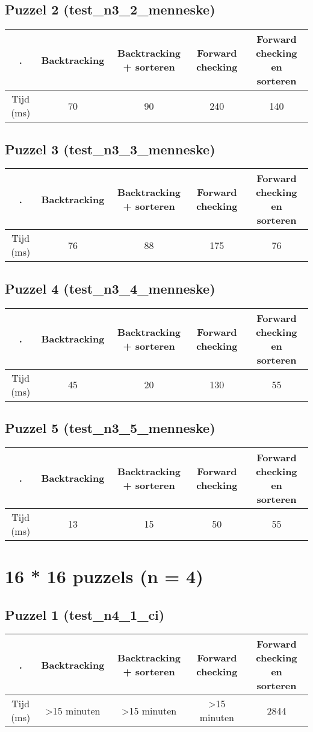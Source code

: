 \documentclass[]{report}
\begin{document}
\begin{appendices}
\subsection{Puzzel 2 (test\_n3\_2\_menneske)}
\begin{tabular}{|c||c|c|c|c|}
\hline . & Backtracking & Backtracking + sorteren & Forward checking & Forward checking en sorteren \\ 
\hline \hline Tijd (ms) & 70 & 90 & 240 & 140 \\ 
\hline 
\end{tabular}
\subsection{Puzzel 3 (test\_n3\_3\_menneske)}
\begin{tabular}{|c||c|c|c|c|}
\hline . & Backtracking & Backtracking + sorteren & Forward checking & Forward checking en sorteren \\ 
\hline \hline Tijd (ms) & 76 & 88 & 175 & 76 \\ 
\hline 
\end{tabular}
\subsection{Puzzel 4 (test\_n3\_4\_menneske)}
\begin{tabular}{|c||c|c|c|c|}
\hline . & Backtracking & Backtracking + sorteren & Forward checking & Forward checking en sorteren \\ 
\hline \hline Tijd (ms) & 45 & 20 & 130 & 55 \\ 
\hline 
\end{tabular}
\subsection{Puzzel 5 (test\_n3\_5\_menneske)}
\begin{tabular}{|c||c|c|c|c|}
\hline . & Backtracking & Backtracking + sorteren & Forward checking & Forward checking en sorteren \\ 
\hline \hline Tijd (ms) & 13 & 15 & 50 & 55 \\ 
\hline 
\end{tabular}
\section{16 * 16 puzzels (n = 4)}
\subsection{Puzzel 1 (test\_n4\_1\_ci)}
\begin{tabular}{|c||c|c|c|c|}
\hline . & Backtracking & Backtracking + sorteren & Forward checking & Forward checking en sorteren \\ 
\hline \hline Tijd (ms) & \textgreater 15 minuten & \textgreater 15 minuten & \textgreater 15 minuten & 2844 \\ 
\hline 
\end{tabular}

\end{appendices}
\end{document}

